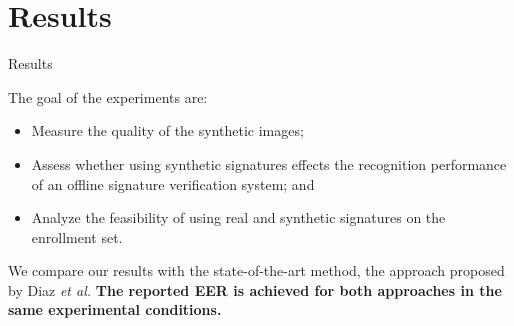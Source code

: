 \documentclass{beamer}
\begin{document}
\section{Results}
\begin{frame}{Results}




The goal of the experiments are:
\begin{itemize}
  \item Measure the quality of the synthetic images;
  \item Assess whether using synthetic signatures effects the recognition performance of an offline signature verification system; and
  \item Analyze the feasibility of using real and synthetic signatures
  on the enrollment set.
\end{itemize}

We compare our results with the state-of-the-art method, the approach proposed by Diaz \textit{et al.} \textbf{The reported EER is achieved for both approaches in the same experimental conditions.}




\end{frame}
\end{document}
